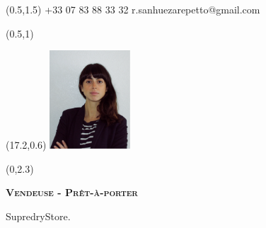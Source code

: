 \documentclass[30pt, french]{tccv}
\begin{document}
\begin{upshape}
\fontsize{9pt}{1em}\color{text}\selectfont



%
%




\begin{textblock}{6.5}(0.5,1.5)
    {+33 07 83 88 33 32}
    {r.sanhuezarepetto@gmail.com}
\end{textblock}

\begin{textblock}{21}(0.5,1)
\end{textblock}

\begin{textblock}{21}(17.2,0.6)
		\includegraphics[width=3cm]{../Figure/Rocio3.png}
\end{textblock}  



\begin{textblock}{21}(0,2.3)

\begin{center}
	{\fontsize{14pt}{5em}\scshape\bfseries Vendeuse - Prêt-à-porter  \\} 

	\vspace{5pt}
	
	{\fontsize{12pt}{1.5em}\color{text}\bodyfontlight\upshape SupredryStore. \\}
\end{center}
\end{textblock}  





%
%





\end{upshape}
\end{document}

